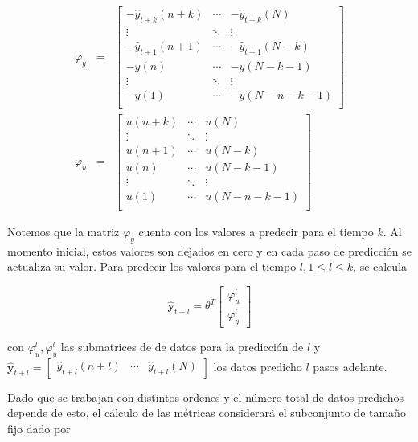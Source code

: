 \begin{eqnarray}
\varphi_y &=& 
\begin{bmatrix}
- \hat{y}_{t+k}(n + k)	& \cdots & - \hat{y}_{t+k}(N)	\\
\vdots					& \ddots & 		\vdots			\\
- \hat{y}_{t+1}(n + 1)	& \cdots & - \hat{y}_{t+1}(N-k)	\\
- 	y(n)				& \cdots & - y(N-k-1)			\\
\vdots					& \ddots & 		\vdots			\\
- 	y(1)				& \cdots & - y(N-n-k-1)			\\
\end{bmatrix}\\
\varphi_u &=& 
\begin{bmatrix}
u(n + k)	& \cdots & u(N)			\\
\vdots		& \ddots & \vdots		\\
u(n + 1)	& \cdots & u(N-k)		\\
u(n)		& \cdots & u(N-k-1)		\\
\vdots		& \ddots & \vdots		\\
u(1)		& \cdots & u(N-n-k-1)	\\
\end{bmatrix}
\end{eqnarray}

Notemos que la matriz $\varphi_y$ cuenta con los valores a predecir para el tiempo $k$. Al momento inicial, estos valores son dejados en cero y en cada paso de predicción se actualiza su valor. Para predecir los valores para el tiempo $l, 1\leq l \leq k$, se calcula

\begin{equation}
	\hat{\textbf{y}}_{t+l} = \theta^T 
	\begin{bmatrix}
	\varphi_u^l \\ \varphi_y^l
	\end{bmatrix}
\end{equation}

con $\varphi_u^l, \varphi_y^l$ las submatrices de de datos para la predicción de $l$ y $\hat{\textbf{y}}_{t+l} = \begin{bmatrix}\hat{y}_{t+l}(n+l) & \cdots & \hat{y}_{t+l}(N)\end{bmatrix}$ los datos predicho $l$ pasos adelante.


Dado que se trabajan con distintos ordenes y el número total de datos predichos depende de esto, el cálculo de las métricas considerará el subconjunto de tamaño fijo dado por

